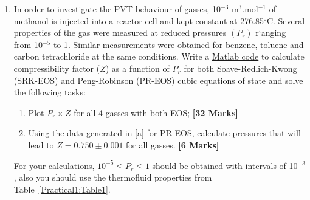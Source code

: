 \documentclass[12pts,a4paper,amsmath,amssymb,floatfix]{article}%
\renewcommand\leq{\leqslant}
\begin{document}
\begin{enumerate}[label=\bfseries Problem \arabic*:]
%
     \item\label{Prob1} In order to investigate the PVT behaviour of gasses, 10$^{-3}$ m$^{3}$.mol$^{-1}$ of methanol is injected into a reactor cell and kept constant at 276.85$^{\circ}$C. Several properties of the gas were measured at reduced pressures $\left(P_{r}\right)$ r`anging from 10$^{-5}$ to 1.  Similar measurements were obtained for benzene, toluene and carbon tetrachloride at the same conditions. Write a \underline{Matlab code} to calculate compressibility factor ($Z$) as a function of $P_{r}$ for both Soave-Redlich-Kwong (SRK-EOS) and Peng-Robinson (PR-EOS) cubic equations of state and solve the following tasks:
          \begin{enumerate}[label=\bfseries Task \arabic*]
              \item\label{a} Plot $P_{r}\times Z$ for all 4 gasses with both EOS; \hfill{\bf[32 Marks]} 
              \item\label{b} Using the data generated in \ref{a} for PR-EOS, calculate pressures that will lead to $Z=0.750\pm0.001$ for all gasses. \hfill{\bf[6 Marks]} 
          \end{enumerate}
For your calculations, $10^{-5}\leq P_{r}\leq 1$ should be obtained with intervals of 10$^{-3}$, also you should use the thermofluid properties from Table~\ref{Practical1:Table1}. 


\end{enumerate}
\end{document}
